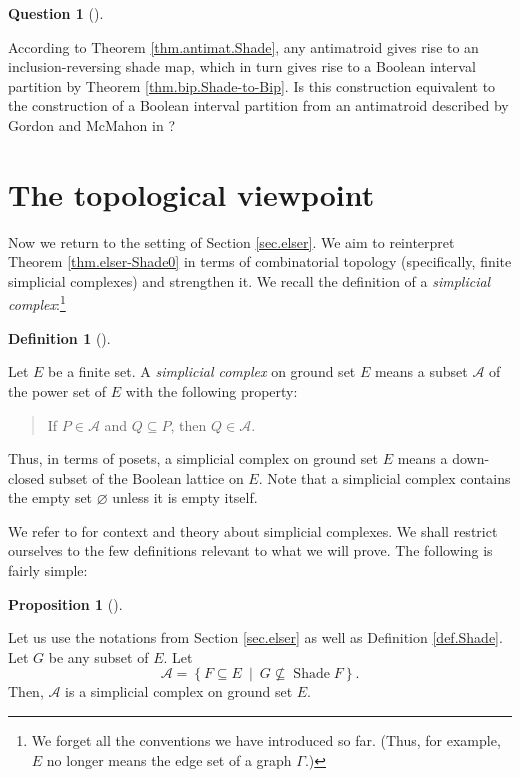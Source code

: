 \documentclass[numbers=enddot,12pt,final,onecolumn]{scrartcl}%
\theoremstyle{definition}
\newtheorem{prop}[theo]{Proposition}
\newenvironment{proposition}[1][]
{\begin{prop}[#1]\begin{leftbar}}
{\end{leftbar}\end{prop}}
\newtheorem{defi}[theo]{Definition}
\newenvironment{definition}[1][]
{\begin{defi}[#1]\begin{leftbar}}
{\end{leftbar}\end{defi}}
\newtheorem{quest}[theo]{Question}
\newenvironment{question}[1][]
{\begin{quest}[#1]\begin{leftbar}}
{\end{leftbar}\end{quest}}
\newenvironment{statement}{\begin{quote}}{\end{quote}}
\newenvironment{question}[1][Question]{\noindent\textbf{#1.} }{\ \rule{0.5em}{0.5em}}
\begin{document}
\begin{question}
According to Theorem \ref{thm.antimat.Shade}, any antimatroid gives rise to an
inclusion-reversing shade map, which in turn gives rise to a Boolean interval
partition by Theorem \ref{thm.bip.Shade-to-Bip}. Is this construction
equivalent to the construction of a Boolean interval partition from an
antimatroid described by Gordon and McMahon in \cite[Theorem 2.5]{GorMah97}?
\end{question}

\section{The topological viewpoint}

Now we return to the setting of Section \ref{sec.elser}. We aim to reinterpret
Theorem \ref{thm.elser-Shade0} in terms of combinatorial topology
(specifically, finite simplicial complexes) and strengthen it. We recall the
definition of a \emph{simplicial complex}:\footnote{We forget all the
conventions we have introduced so far. (Thus, for example, $E$ no longer means
the edge set of a graph $\Gamma$.)}

\begin{definition}
Let $E$ be a finite set. A \emph{simplicial complex} on ground set $E$ means a
subset $\mathcal{A}$ of the power set of $E$ with the following property:

\begin{statement}
If $P\in\mathcal{A}$ and $Q\subseteq P$, then $Q\in\mathcal{A}$.
\end{statement}
\end{definition}

Thus, in terms of posets, a simplicial complex on ground set $E$ means a
down-closed subset of the Boolean lattice on $E$. Note that a simplicial
complex contains the empty set $\varnothing$ unless it is empty itself.

We refer to \cite{Kozlov20} for context and theory about simplicial complexes.
We shall restrict ourselves to the few definitions relevant to what we will
prove. The following is fairly simple:

\begin{proposition}
\label{prop.elser-sc}Let us use the notations from Section \ref{sec.elser} as
well as Definition \ref{def.Shade}. Let $G$ be any subset of $E$. Let%
\begin{equation}
\mathcal{A}=\left\{  F\subseteq E\ \mid\ G\not \subseteq \operatorname*{Shade}%
F\right\}  . \label{eq.prop.elser-sc.A=}%
\end{equation}
Then, $\mathcal{A}$ is a simplicial complex on ground set $E$.
\end{proposition}
\end{document}
